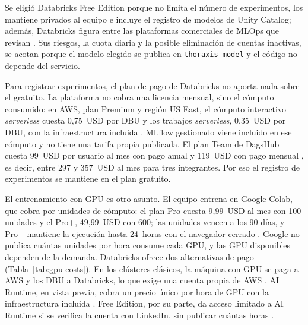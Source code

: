 Se eligió Databricks Free Edition porque no limita el número de experimentos,
los mantiene privados al equipo e incluye el registro de modelos de Unity
Catalog; además, Databricks figura entre las plataformas comerciales de MLOps
que revisan \textcite{kreuzberger2023}. Sus riesgos, la cuota diaria y la
posible eliminación de cuentas inactivas, se acotan porque el modelo elegido
se publica en \texttt{thoraxis-model} y el código no depende del servicio.

Para registrar experimentos, el plan de pago de Databricks no aporta nada sobre
el gratuito. La plataforma no cobra una licencia mensual, sino el cómputo
consumido: en AWS, plan Premium y región US East, el cómputo interactivo
\textit{serverless} cuesta 0{,}75~USD por DBU y los trabajos
\textit{serverless}, 0{,}35~USD por DBU, con la infraestructura incluida
\parencite{databrickspricing, databricksjobs}. MLflow gestionado viene incluido
en ese cómputo y no tiene una tarifa propia publicada. El plan Team de DagsHub
cuesta 99~USD por usuario al mes con pago anual y 119~USD con pago mensual
\parencite{dagshubpricing}, es decir, entre 297 y 357~USD al mes para tres
integrantes. Por eso el registro de experimentos se mantiene en el plan
gratuito.

El entrenamiento con GPU es otro asunto. El equipo entrena en Google Colab,
que cobra por unidades de cómputo: el plan Pro cuesta 9{,}99~USD al mes con
100 unidades y el Pro+, 49{,}99~USD con 600; las unidades vencen a los 90
días, y Pro+ mantiene la ejecución hasta 24~horas con el navegador cerrado
\parencite{colabpricing}. Google no publica cuántas unidades por hora consume
cada GPU, y las GPU disponibles dependen de la demanda. Databricks ofrece dos
alternativas de pago (Tabla~\ref{tab:gpu-costs}). En los clústeres clásicos, la
máquina con GPU se paga a AWS y los DBU a Databricks, lo que exige una cuenta
propia de AWS \parencite{databrickscalculator, awsec2}. AI Runtime, en vista
previa, cobra un precio único por hora de GPU con la infraestructura incluida
\parencite{databricksairuntime}. Free Edition, por su parte, da acceso limitado
a AI Runtime si se verifica la cuenta con LinkedIn, sin publicar cuántas horas
\parencite{databricksfree}.

